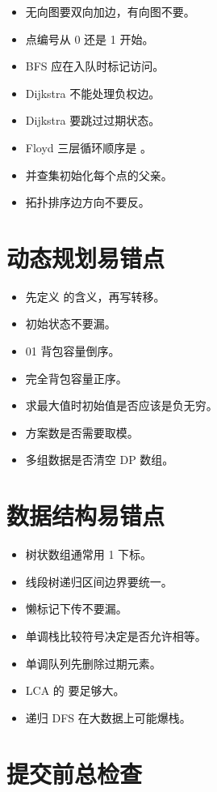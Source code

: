 \begin{itemize}
  \item 无向图要双向加边，有向图不要。
  \item 点编号从 0 还是 1 开始。
  \item BFS 应在入队时标记访问。
  \item Dijkstra 不能处理负权边。
  \item Dijkstra 要跳过过期状态。
  \item Floyd 三层循环顺序是 。
  \item 并查集初始化每个点的父亲。
  \item 拓扑排序边方向不要反。
\end{itemize}

\section{动态规划易错点}\label{sec:10-11}

\begin{itemize}
  \item 先定义  的含义，再写转移。
  \item 初始状态不要漏。
  \item 01 背包容量倒序。
  \item 完全背包容量正序。
  \item 求最大值时初始值是否应该是负无穷。
  \item 方案数是否需要取模。
  \item 多组数据是否清空 DP 数组。
\end{itemize}

\section{数据结构易错点}\label{sec:10-12}

\begin{itemize}
  \item 树状数组通常用 1 下标。
  \item 线段树递归区间边界要统一。
  \item 懒标记下传不要漏。
  \item 单调栈比较符号决定是否允许相等。
  \item 单调队列先删除过期元素。
  \item LCA 的  要足够大。
  \item 递归 DFS 在大数据上可能爆栈。
\end{itemize}

\section{提交前总检查}\label{sec:10-13}

